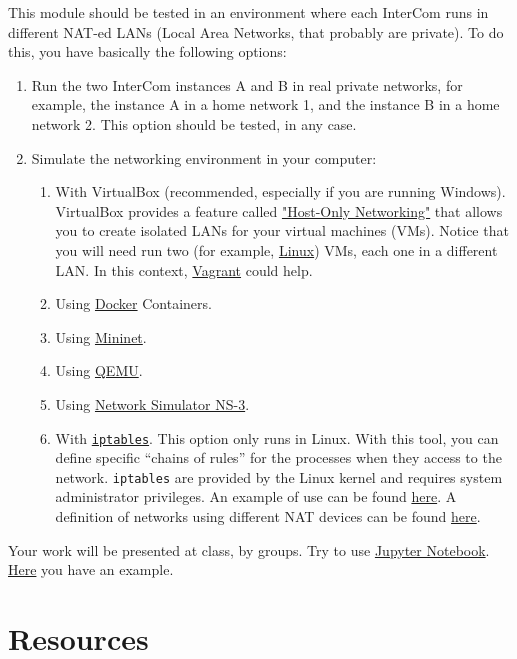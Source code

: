 This module should be tested in an environment where each InterCom
runs in different NAT-ed LANs (Local Area Networks, that probably are
private). To do this, you have basically the following options:
\begin{enumerate}
\item Run the two InterCom instances A and B in real private networks,
  for example, the instance A in a home network 1, and the instance B
  in a home network 2. This option should be tested, in any case.
\item Simulate the networking environment in your computer:
  \begin{enumerate}
  \item With VirtualBox (recommended, especially if you are running
    Windows). VirtualBox provides a feature called
    \href{https://www.virtualbox.org/manual/ch06.html#network_hostonly}{"Host-Only
      Networking"} that allows you to create isolated LANs for your
    virtual machines (VMs). Notice that you will need run two (for
    example, \href{https://xubuntu.org/download/}{Linux}) VMs, each
    one in a different LAN. In this context,
    \href{https://www.vagrantup.com/}{Vagrant} could help.
  \item Using \href{https://www.docker.com/}{Docker} Containers.
  \item Using \href{http://mininet.org/}{Mininet}.
  \item Using \href{https://www.qemu.org/}{QEMU}.
  \item Using \href{https://www.nsnam.org/}{Network Simulator NS-3}.
  \item With
    \href{https://en.wikipedia.org/wiki/Iptables}{\texttt{iptables}}. This
    option only runs in Linux. With this tool, you can define specific
    ``chains of rules'' for the processes when they access to the
    network. \texttt{iptables} are provided by the Linux kernel and
    requires system administrator privileges. An example of use can be
    found
    \href{https://github.com/P2PSP/console/blob/master/src/setup_NAT_network.sh}{here}. A
    definition of networks using different NAT devices can be found
    \href{https://github.com/P2PSP/core/tree/master/doc/NTS/iptables}{here}.
  \end{enumerate}
\end{enumerate}

Your work will be presented at class, by groups. Try to use
\href{https://jupyter.org/}{Jupyter
  Notebook}. \href{https://github.com/Tecnologias-multimedia/InterCom/blob/master/docs/2-hours_seminar.ipynb}{Here}
you have an example.

\section{Resources}


